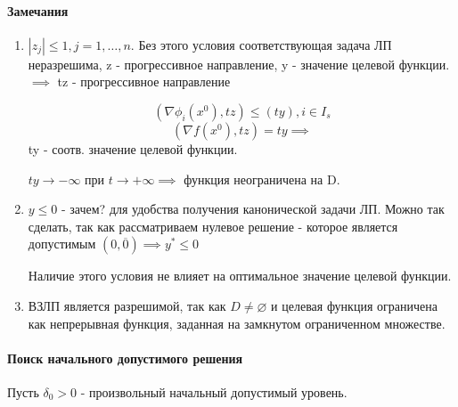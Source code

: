 \documentclass[a4paper]{article}
\theoremstyle{definition}
\theoremstyle{remark}
\begin{document}
\paragraph*{Замечания}
\begin{enumerate}
    \item $|z_j|\le 1, j = 1, \dots, n.$ Без этого условия соответствующая задача ЛП неразрешима, z - прогрессивное направление, y - значение целевой функции. $\implies$ tz - прогрессивное направление 

    \[(\nabla \phi_i(x^0), tz) \le (ty), i\in I_s\]
    \[(\nabla f(x^0), tz) = ty\implies\] 
    ty - соотв. значение целевой функции.

    $ty\to -\infty$ при $t \to +\infty\implies$ функция неограничена на D.

    \item $y \le 0$ - зачем? для удобства получения канонической задачи ЛП. Можно так сделать, так как рассматриваем нулевое решение - которое является допустимым $(0, \overline{0})\implies y ^*\le 0$
    
    Наличие этого условия не влияет на оптимальное значение целевой функции.

    \item ВЗЛП является разрешимой, так как $D\neq \varnothing$ и целевая функция ограничена как непрерывная функция, заданная на замкнутом ограниченном множестве.

\end{enumerate}
\paragraph*{Поиск начального допустимого решения}

Пусть $\delta_0 > 0$ - произвольный начальный допустимый уровень.
\end{document}
